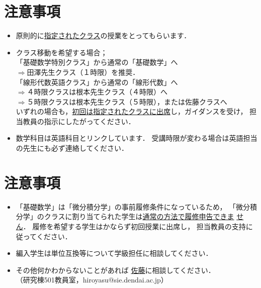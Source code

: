 \documentclass[a4j,landscape,25pt]{jsarticle}
\begin{document}
\section{注意事項}

\begin{itemize}
 \item 原則的に\underline{指定されたクラス}の授業をとってもらいます．
 \item クラス移動を希望する場合；\\
 「基礎数学特別クラス」から通常の「基礎数学」へ\\
 \quad $\Longrightarrow$田澤先生クラス（１時限）を推奨．\\
「線形代数英語クラス」から通常の「線形代数」へ\\
 \quad $\Longrightarrow$４時限クラスは根本先生クラス（４時限）へ\\
 \quad $\Longrightarrow$５時限クラスは根本先生クラス（５時限），または佐藤クラスへ\\
いずれの場合も，\underline{初回は指定されたクラスに出席}し，ガイダンスを受け，
担当教員の指示にしたがってください．\\
 \item 数学科目は英語科目とリンクしています．
受講時限が変わる場合は英語担当の先生にも必ず連絡してください．
\end{itemize}

\section{注意事項}

\begin{itemize}
 \item 「基礎数学」は「微分積分学」の事前履修条件になっているため，
「微分積分学」のクラスに割り当てられた学生は\underline{通常の方法で履修申告できま}{ }\underline{せん}．
履修を希望する学生はかならず初回授業に出席し，
担当教員の支持に従ってください．\\
 \item 編入学生は単位互換等について学級担任に相談してください．\\
 \item その他何かわからないことがあれば
\underline{佐藤}に相談してください．\\
（研究棟501教員室，hiroyasu@sie.dendai.ac.jp）
\end{itemize}
\end{document}
